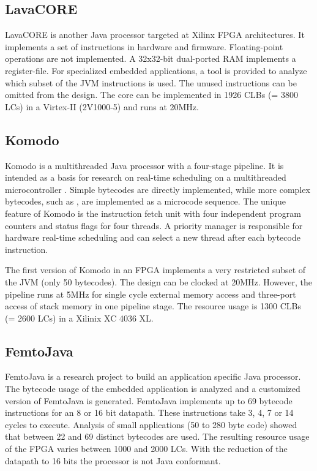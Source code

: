 \subsection{LavaCORE}

LavaCORE \cite{LavaCORE} is another Java processor targeted at
Xilinx FPGA architectures. It implements a set of instructions in
hardware and firmware. Floating-point operations are not
implemented. A 32x32-bit dual-ported RAM implements a register-file.
For specialized embedded applications, a tool is provided to analyze
which subset of the JVM instructions is used. The unused
instructions can be omitted from the design. The core can be
implemented in 1926 CLBs (= 3800 LCs) in a Virtex-II (2V1000-5) and
runs at 20MHz.

\subsection{Komodo}
\label{subsec:related:komodo}

Komodo \cite{Zulauf00} is a multithreaded Java processor with a
four-stage pipeline. It is intended as a basis for research on
real-time scheduling on a multithreaded microcontroller
\cite{komodo2003}. Simple bytecodes are directly implemented, while
more complex bytecodes, such as , are implemented as a
microcode sequence. The unique feature of Komodo is the instruction
fetch unit with four independent program counters and status flags
for four threads. A priority manager is responsible for hardware
real-time scheduling and can select a new thread after each bytecode
instruction.


The first version of Komodo in an FPGA implements a very restricted
subset of the JVM (only 50 bytecodes). The design can be clocked at
20MHz. However, the pipeline runs at 5MHz for single cycle external
memory access and three-port access of stack memory in one pipeline
stage. The resource usage is 1300 CLBs (= 2600 LCs) in a Xilinix XC
4036 XL.

\subsection{FemtoJava}

FemtoJava \cite{Femto01} is a research project to build an
application specific Java processor. The bytecode usage of the
embedded application is analyzed and a customized version of
FemtoJava is generated. FemtoJava implements up to 69 bytecode
instructions for an 8 or 16 bit datapath. These instructions take 3,
4, 7 or 14 cycles to execute. Analysis of small applications (50 to
280 byte code) showed that between 22 and 69 distinct bytecodes are
used. The resulting resource usage of the FPGA varies between 1000
and 2000 LCs. With the reduction of the datapath to 16 bits the
processor is not Java conformant.

